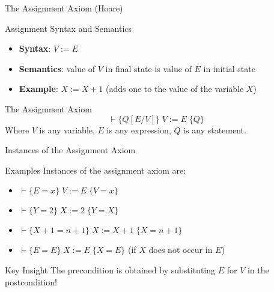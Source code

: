 \begin{frame}{The Assignment Axiom (Hoare)}
    \begin{block}{Assignment Syntax and Semantics}
        \begin{itemize}
            \item \textbf{Syntax}: $V := E$
            \item \textbf{Semantics}: value of $V$ in final state is value of $E$ in initial state
            \item \textbf{Example}: $X := X + 1$ (adds one to the value of the variable $X$)
        \end{itemize}
    \end{block}
    
    \begin{block}{The Assignment Axiom}
        \[ \vdash \{Q[E/V]\} \; V := E \; \{Q\} \]
        Where $V$ is any variable, $E$ is any expression, $Q$ is any statement.
    \end{block}
\end{frame}

\begin{frame}{Instances of the Assignment Axiom}
    \begin{block}{Examples}
        Instances of the assignment axiom are:
        \begin{itemize}
            \item $\vdash \{E = x\} \; V := E \; \{V = x\}$
            \item $\vdash \{Y = 2\} \; X := 2 \; \{Y = X\}$
            \item $\vdash \{X + 1 = n + 1\} \; X := X + 1 \; \{X = n + 1\}$
            \item $\vdash \{E = E\} \; X := E \; \{X = E\}$ (if $X$ does not occur in $E$)
        \end{itemize}
    \end{block}
    
    \begin{block}{Key Insight}
        The precondition is obtained by substituting $E$ for $V$ in the postcondition!
    \end{block}
\end{frame}

